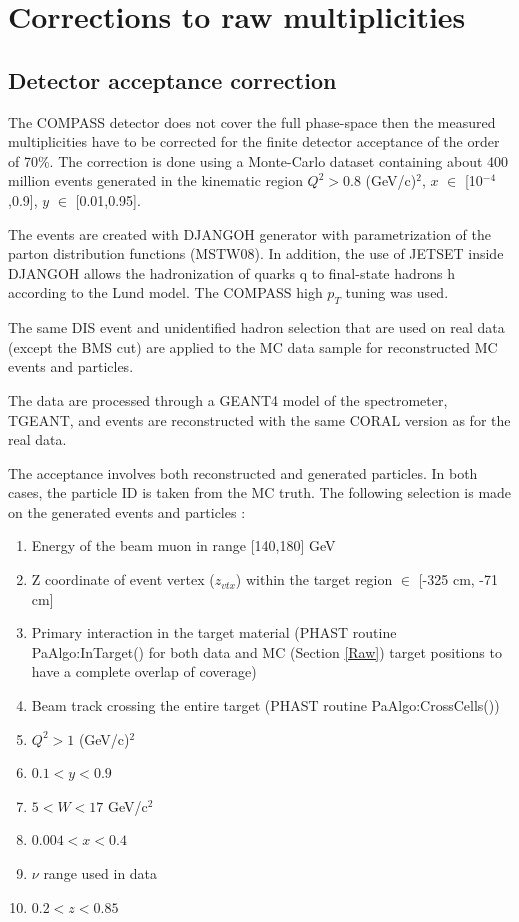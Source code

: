 \documentclass[letterpaper,12pt]{article}
\begin{document}
\section{Corrections to raw multiplicities} \label{Cor}

\subsection{Detector acceptance correction}

The COMPASS detector does not cover the full phase-space then the measured multiplicities have
to be corrected for the finite detector acceptance of the order of 70\%. The correction is
done using a Monte-Carlo dataset containing about 400 million events generated in the kinematic
region $Q^2 > 0.8$ (GeV/c)$^2$, $x$ $\in$ [10$^{-4}$,0.9], $y$ $\in$ [0.01,0.95].

The events are created with DJANGOH generator with parametrization of the parton distribution functions
(MSTW08). In addition, the use of JETSET inside DJANGOH allows the hadronization of quarks q to final-state
hadrons h according to the Lund model. The COMPASS high $p_T$ tuning was used.

The same DIS event and unidentified hadron selection that are used on real data (except the BMS cut) are applied
to the MC data sample for reconstructed MC events and particles.

The data are processed through a GEANT4 model of the spectrometer, TGEANT, and events are reconstructed with the
same CORAL version as for the real data.

The acceptance involves both reconstructed and generated particles. In both cases, the particle ID is taken from
the MC truth. The following selection is made on the generated events and particles :

\begin{enumerate}
  \item Energy of the beam muon in range [140,180] GeV
	\item Z coordinate of event vertex ($z_{vtx}$) within the target region $\in$ [-325 cm, -71 cm]
	\item Primary interaction in the target material (PHAST routine PaAlgo:InTarget() for both data and MC (Section \ref{Raw}) target positions
				to have a complete overlap of coverage)
	\item Beam track crossing the entire target (PHAST routine PaAlgo:CrossCells())
  \item $Q^2>1$ (GeV/c)$^2$
  \item $0.1 < y < 0.9$
	\item $5 < W < 17$ GeV/c$^2$
  \item $0.004 < x < 0.4$
  \item $\nu$ range used in data
  \item $0.2 < z < 0.85$
\end{enumerate}
\end{document}
